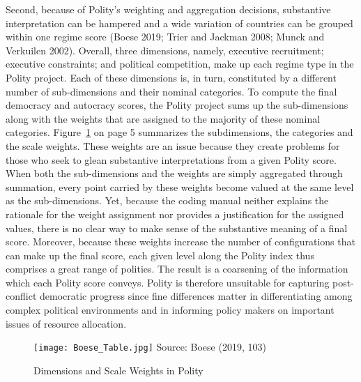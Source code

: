 \documentclass [11pt]{article}
\begin{document}
Second, because of Polity's weighting and aggregation decisions, substantive interpretation can be hampered and a wide variation of countries can be grouped within one regime score (Boese 2019; Trier and Jackman 2008; Munck and Verkuilen 2002). Overall, three dimensions, namely, executive recruitment; executive constraints; and political competition, make up each regime type in the Polity project. Each of these dimensions is, in turn, constituted by a different number of sub-dimensions and their nominal categories. To compute the final democracy and autocracy scores, the Polity project sums up the sub-dimensions along with the weights that are assigned to the majority of these nominal categories. Figure~\ref{fig1} on page 5 summarizes the subdimensions, the categories and the scale weights. These weights are an issue because they create problems for those who seek to glean substantive interpretations from a given Polity score. When both the sub-dimensions and the weights are simply aggregated through summation, every point carried by these weights become valued at the same level as the sub-dimensions. Yet, because the coding manual neither explains the rationale for the weight assignment nor provides a justification for the assigned values, there is no clear way to make sense of the substantive meaning of a final score. Moreover, because these weights increase the number of configurations that can make up the final score, each given level along the Polity index thus comprises a great range of polities. The result is a coarsening of the information which each Polity score conveys. Polity is therefore unsuitable for capturing post-conflict democratic progress since fine differences matter in differentiating among complex political environments and in informing policy makers on important issues of resource allocation.

\begin{figure} [h!]

\caption{Dimensions and Scale Weights in Polity}
\label{fig1}%
\begin{center} 
\small
 \texttt{[image: Boese\_Table.jpg]}
{\footnotesize Source: Boese (2019, 103)}

\end{center} 
\end{figure}
\end{document}
